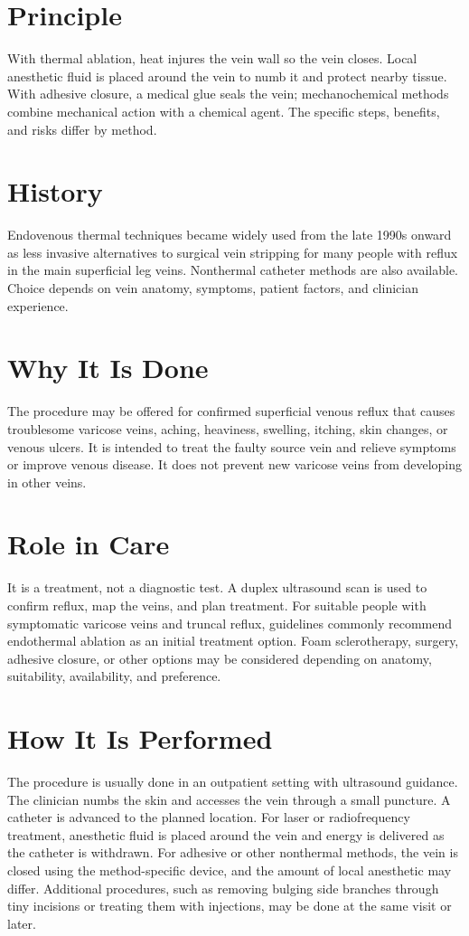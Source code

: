 \section*{Principle}
With thermal ablation, heat injures the vein wall so the vein closes. Local anesthetic fluid is placed around the vein to numb it and protect nearby tissue. With adhesive closure, a medical glue seals the vein; mechanochemical methods combine mechanical action with a chemical agent. The specific steps, benefits, and risks differ by method.

\section*{History}
Endovenous thermal techniques became widely used from the late 1990s onward as less invasive alternatives to surgical vein stripping for many people with reflux in the main superficial leg veins. Nonthermal catheter methods are also available. Choice depends on vein anatomy, symptoms, patient factors, and clinician experience.

\section*{Why It Is Done}
The procedure may be offered for confirmed superficial venous reflux that causes troublesome varicose veins, aching, heaviness, swelling, itching, skin changes, or venous ulcers. It is intended to treat the faulty source vein and relieve symptoms or improve venous disease. It does not prevent new varicose veins from developing in other veins.

\section*{Role in Care}
It is a treatment, not a diagnostic test. A duplex ultrasound scan is used to confirm reflux, map the veins, and plan treatment. For suitable people with symptomatic varicose veins and truncal reflux, guidelines commonly recommend endothermal ablation as an initial treatment option. Foam sclerotherapy, surgery, adhesive closure, or other options may be considered depending on anatomy, suitability, availability, and preference.

\section*{How It Is Performed}
The procedure is usually done in an outpatient setting with ultrasound guidance. The clinician numbs the skin and accesses the vein through a small puncture. A catheter is advanced to the planned location. For laser or radiofrequency treatment, anesthetic fluid is placed around the vein and energy is delivered as the catheter is withdrawn. For adhesive or other nonthermal methods, the vein is closed using the method-specific device, and the amount of local anesthetic may differ. Additional procedures, such as removing bulging side branches through tiny incisions or treating them with injections, may be done at the same visit or later.

